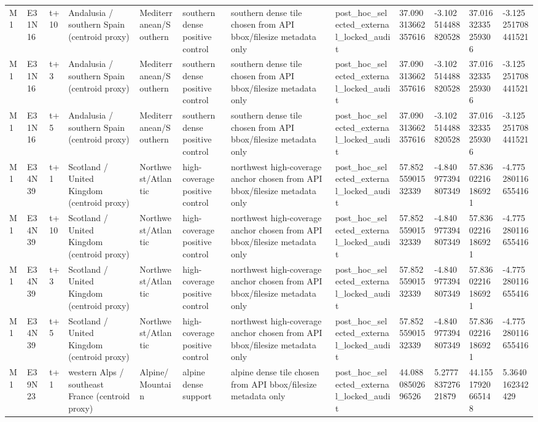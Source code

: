 \begin{landscape}
\begin{longtable}{llllllllllll}
M1 & E31N16 & t+10 & Andalusia / southern Spain (centroid proxy) & Mediterranean/Southern & southern dense positive control & southern dense tile chosen from API bbox/filesize metadata only & post\_hoc\_selected\_external\_locked\_audit & 37.090313662357616 & -3.102514488820528 & 37.01632335259306 & -3.125251708441521 \\
M1 & E31N16 & t+3 & Andalusia / southern Spain (centroid proxy) & Mediterranean/Southern & southern dense positive control & southern dense tile chosen from API bbox/filesize metadata only & post\_hoc\_selected\_external\_locked\_audit & 37.090313662357616 & -3.102514488820528 & 37.01632335259306 & -3.125251708441521 \\
M1 & E31N16 & t+5 & Andalusia / southern Spain (centroid proxy) & Mediterranean/Southern & southern dense positive control & southern dense tile chosen from API bbox/filesize metadata only & post\_hoc\_selected\_external\_locked\_audit & 37.090313662357616 & -3.102514488820528 & 37.01632335259306 & -3.125251708441521 \\
M1 & E34N39 & t+1 & Scotland / United Kingdom (centroid proxy) & Northwest/Atlantic & high-coverage positive control & northwest high-coverage anchor chosen from API bbox/filesize metadata only & post\_hoc\_selected\_external\_locked\_audit & 57.85255901532339 & -4.840977394807349 & 57.83602216186921 & -4.775280116655416 \\
M1 & E34N39 & t+10 & Scotland / United Kingdom (centroid proxy) & Northwest/Atlantic & high-coverage positive control & northwest high-coverage anchor chosen from API bbox/filesize metadata only & post\_hoc\_selected\_external\_locked\_audit & 57.85255901532339 & -4.840977394807349 & 57.83602216186921 & -4.775280116655416 \\
M1 & E34N39 & t+3 & Scotland / United Kingdom (centroid proxy) & Northwest/Atlantic & high-coverage positive control & northwest high-coverage anchor chosen from API bbox/filesize metadata only & post\_hoc\_selected\_external\_locked\_audit & 57.85255901532339 & -4.840977394807349 & 57.83602216186921 & -4.775280116655416 \\
M1 & E34N39 & t+5 & Scotland / United Kingdom (centroid proxy) & Northwest/Atlantic & high-coverage positive control & northwest high-coverage anchor chosen from API bbox/filesize metadata only & post\_hoc\_selected\_external\_locked\_audit & 57.85255901532339 & -4.840977394807349 & 57.83602216186921 & -4.775280116655416 \\
M1 & E39N23 & t+1 & western Alps / southeast France (centroid proxy) & Alpine/Mountain & alpine dense support & alpine dense tile chosen from API bbox/filesize metadata only & post\_hoc\_selected\_external\_locked\_audit & 44.08808502696526 & 5.277783727621879 & 44.15517920665148 & 5.3640162342429 \\

\end{longtable}
\end{landscape}
